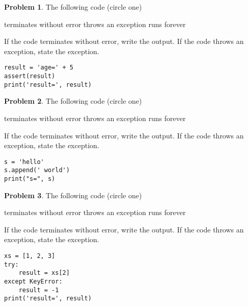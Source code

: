\documentclass[10pt]{article}
\theoremstyle{definition}
\newtheorem{problem}{Problem}
\begin{document}
\begin{problem}
    The following code (circle one)

    \vspace{0.25in}
    \hspace{0.5in}terminates without error 
    \hspace{1in}throws an exception
    \hspace{1in}runs forever
    \vspace{0.25in}

    \noindent
    If the code terminates without error, write the output.
    If the code throws an exception, state the exception.
\end{problem}
\begin{lstlisting}
result = 'age=' + 5
assert(result)
print('result=', result)
\end{lstlisting}
\vspace{1in}


\begin{problem}
    The following code (circle one)

    \vspace{0.25in}
    \hspace{0.5in}terminates without error 
    \hspace{1in}throws an exception
    \hspace{1in}runs forever
    \vspace{0.25in}

    \noindent
    If the code terminates without error, write the output.
    If the code throws an exception, state the exception.
\end{problem}
\begin{lstlisting}
s = 'hello'
s.append(' world')
print("s=", s)
\end{lstlisting}
\vspace{1in}


\begin{problem}
    The following code (circle one)

    \vspace{0.25in}
    \hspace{0.5in}terminates without error 
    \hspace{1in}throws an exception
    \hspace{1in}runs forever
    \vspace{0.25in}

    \noindent
    If the code terminates without error, write the output.
    If the code throws an exception, state the exception.
\end{problem}
\begin{lstlisting}
xs = [1, 2, 3]
try:
    result = xs[2]
except KeyError:
    result = -1
print('result=', result)
\end{lstlisting}
\vspace{1in}
\end{document}
